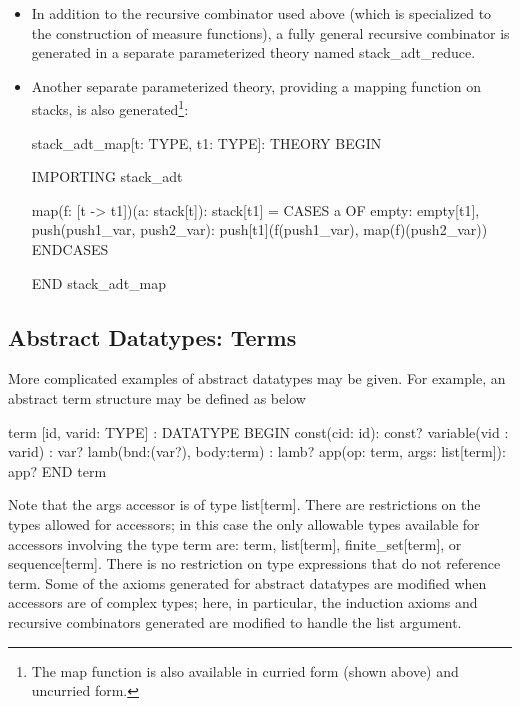 \begin{itemize}
\item In addition to the recursive combinator used above (which is
specialized to the construction of measure functions), a fully general
recursive combinator is generated in a separate parameterized theory
named {\stt stack\_adt\_reduce}.

\item Another separate parameterized theory, providing a mapping function
on stacks, is also generated\footnote{The map function is also available
in curried form (shown above) and uncurried form.}:
\begin{pvsexample}
  stack_adt_map[t: TYPE, t1: TYPE]: THEORY
    BEGIN
  
    IMPORTING stack_adt
  
    map(f: [t -> t1])(a: stack[t]): stack[t1] =
      CASES a OF
        empty: empty[t1],
        push(push1_var, push2_var):
            push[t1](f(push1_var), map(f)(push2_var))
      ENDCASES
 
    END stack_adt_map
\end{pvsexample}

\end{itemize}

\subsection{Abstract Datatypes: Terms}

More complicated examples of abstract datatypes may be given.  For
example, an abstract term structure may be defined as below
\begin{pvsexample}
  term [id, varid: TYPE] : DATATYPE
   BEGIN
    const(cid: id): const?
    variable(vid : varid) : var?
    lamb(bnd:(var?), body:term) : lamb?
    app(op: term, args: list[term]): app?
   END term
\end{pvsexample}
%
Note that the {\stt args} accessor is of type {\stt list[term]}.
There are restrictions on the types allowed for accessors; in this
case the only allowable types available for accessors involving the
type {\stt term} are: {\stt term}, {\stt list[term]}, {\stt
finite\_set[term]}, or {\stt sequence[term]}.  There is
no restriction on type expressions that do not reference {\stt term}.
Some of the axioms generated for abstract datatypes are modified when
accessors are of complex types; here, in particular, the induction axioms
and recursive combinators generated are modified to handle the list argument.

%
%     

